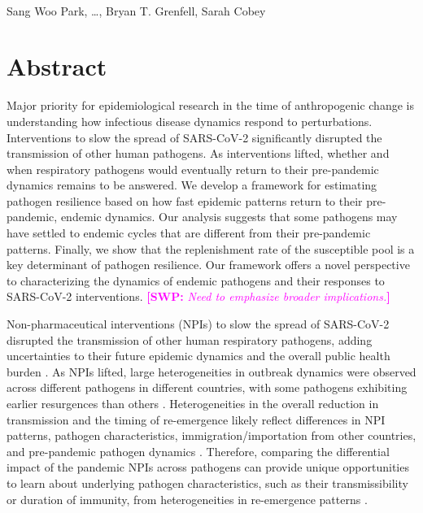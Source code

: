 \documentclass[12pt]{article}
\date{\today}
\newcommand{\comment}{\showcomment}
\newcommand{\showcomment}[3]{\textcolor{#1}{\textbf{[#2: }\textsl{#3}\textbf{]}}}
\newcommand{\swp}[1]{\comment{magenta}{SWP}{#1}}
\begin{document}
\begin{flushleft}{
	\Large
	\textbf{}
}
\newline
\\
Sang Woo Park, \dots, Bryan T. Grenfell, Sarah Cobey
\\
\bigskip
\end{flushleft}

\section*{Abstract}

Major priority for epidemiological research in the time of anthropogenic change is understanding how infectious disease dynamics respond to perturbations.
Interventions to slow the spread of SARS-CoV-2 significantly disrupted the transmission of other human pathogens. 
As interventions lifted, whether and when respiratory pathogens would eventually return to their pre-pandemic dynamics remains to be answered. 
We develop a framework for estimating pathogen resilience based on how fast epidemic patterns return to their pre-pandemic, endemic dynamics.
Our analysis suggests that some pathogens may have settled to endemic cycles that are different from their pre-pandemic patterns.
Finally, we show that the replenishment rate of the susceptible pool is a key determinant of pathogen resilience.
Our framework offers a novel perspective to characterizing the dynamics of endemic pathogens and their responses to SARS-CoV-2 interventions.
\swp{Need to emphasize broader implications.}

\pagebreak

Non-pharmaceutical interventions (NPIs) to slow the spread of SARS-CoV-2 disrupted the transmission of other human respiratory pathogens, adding uncertainties to their future epidemic dynamics and the overall public health burden \citep{baker2020impact}.
As NPIs lifted, large heterogeneities in outbreak dynamics were observed across different pathogens in different countries, with some pathogens exhibiting earlier resurgences than others \citep{gomez2021uncertain,koltai2022determinants,park2024predicting}.
Heterogeneities in the overall reduction in transmission and the timing of re-emergence likely reflect differences in NPI patterns, pathogen characteristics, immigration/importation from other countries, and pre-pandemic pathogen dynamics \citep{perofsky2024impacts}.
Therefore, comparing the differential impact of the pandemic NPIs across pathogens can provide unique opportunities to learn about underlying pathogen characteristics, such as their transmissibility or duration of immunity, from heterogeneities in re-emergence patterns \citep{chow2023effects}.
\end{document}
